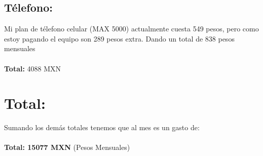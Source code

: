 \documentclass[13pt,letterpaper]{article}
\begin{document}
    \subsection{Télefono:}
      Mi plan de télefono celular (MAX 5000) actualmente cuesta 549  pesos, pero como estoy pagando el equipo son 289 pesos extra. Dando un total de 838 pesos mensuales \\ \\
      \textbf{Total:} 4088 MXN
    \section{Total:}
      Sumando los demás totales tenemos que al mes es un gasto de:\\ \\
      {\Large \textbf{Total: 15077 MXN}} (Pesos Mensuales)
\end{document}
